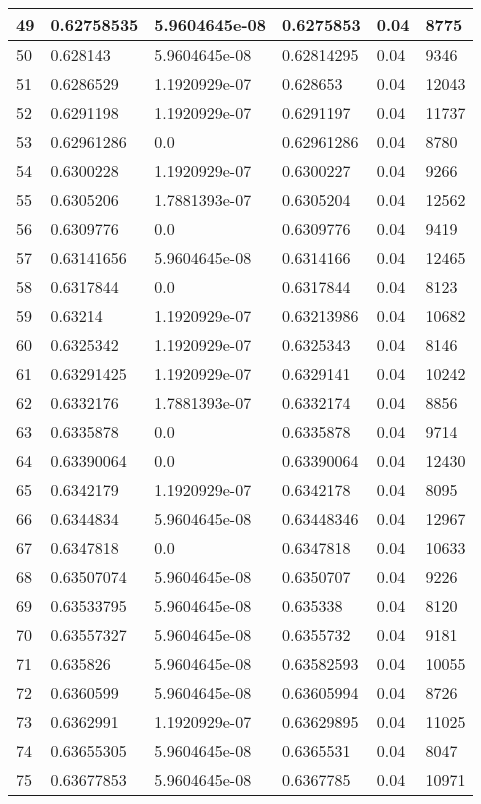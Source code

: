 \begin{longtable}{|l|l|l|l|l|l|}
49 & 0.62758535 & 5.9604645e-08 & 0.6275853 & 0.04 & 8775 \\ \hline 
50 & 0.628143 & 5.9604645e-08 & 0.62814295 & 0.04 & 9346 \\ \hline 
51 & 0.6286529 & 1.1920929e-07 & 0.628653 & 0.04 & 12043 \\ \hline 
52 & 0.6291198 & 1.1920929e-07 & 0.6291197 & 0.04 & 11737 \\ \hline 
53 & 0.62961286 & 0.0 & 0.62961286 & 0.04 & 8780 \\ \hline 
54 & 0.6300228 & 1.1920929e-07 & 0.6300227 & 0.04 & 9266 \\ \hline 
55 & 0.6305206 & 1.7881393e-07 & 0.6305204 & 0.04 & 12562 \\ \hline 
56 & 0.6309776 & 0.0 & 0.6309776 & 0.04 & 9419 \\ \hline 
57 & 0.63141656 & 5.9604645e-08 & 0.6314166 & 0.04 & 12465 \\ \hline 
58 & 0.6317844 & 0.0 & 0.6317844 & 0.04 & 8123 \\ \hline 
59 & 0.63214 & 1.1920929e-07 & 0.63213986 & 0.04 & 10682 \\ \hline 
60 & 0.6325342 & 1.1920929e-07 & 0.6325343 & 0.04 & 8146 \\ \hline 
61 & 0.63291425 & 1.1920929e-07 & 0.6329141 & 0.04 & 10242 \\ \hline 
62 & 0.6332176 & 1.7881393e-07 & 0.6332174 & 0.04 & 8856 \\ \hline 
63 & 0.6335878 & 0.0 & 0.6335878 & 0.04 & 9714 \\ \hline 
64 & 0.63390064 & 0.0 & 0.63390064 & 0.04 & 12430 \\ \hline 
65 & 0.6342179 & 1.1920929e-07 & 0.6342178 & 0.04 & 8095 \\ \hline 
66 & 0.6344834 & 5.9604645e-08 & 0.63448346 & 0.04 & 12967 \\ \hline 
67 & 0.6347818 & 0.0 & 0.6347818 & 0.04 & 10633 \\ \hline 
68 & 0.63507074 & 5.9604645e-08 & 0.6350707 & 0.04 & 9226 \\ \hline 
69 & 0.63533795 & 5.9604645e-08 & 0.635338 & 0.04 & 8120 \\ \hline 
70 & 0.63557327 & 5.9604645e-08 & 0.6355732 & 0.04 & 9181 \\ \hline 
71 & 0.635826 & 5.9604645e-08 & 0.63582593 & 0.04 & 10055 \\ \hline 
72 & 0.6360599 & 5.9604645e-08 & 0.63605994 & 0.04 & 8726 \\ \hline 
73 & 0.6362991 & 1.1920929e-07 & 0.63629895 & 0.04 & 11025 \\ \hline 
74 & 0.63655305 & 5.9604645e-08 & 0.6365531 & 0.04 & 8047 \\ \hline 
75 & 0.63677853 & 5.9604645e-08 & 0.6367785 & 0.04 & 10971 \\ \hline 
\end{longtable}